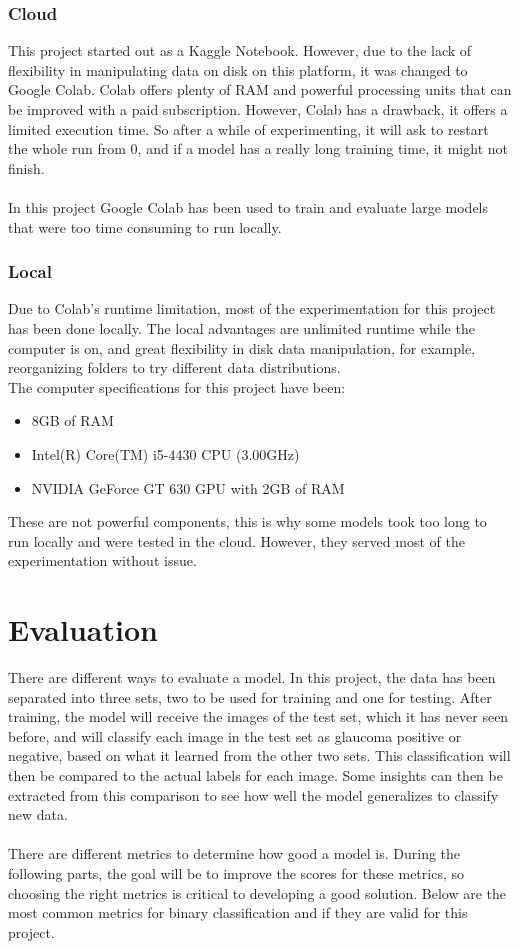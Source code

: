 \documentclass[11pt, a4paper]{article}
\begin{document}
\subsubsection{Cloud}
This project started out as a Kaggle Notebook. However, due to the lack of flexibility in manipulating data on disk on this platform, it was changed to Google Colab. Colab offers plenty of RAM and powerful processing units that can be improved with a paid subscription. However, Colab has a drawback, it offers a limited execution time. So after a while of experimenting, it will ask to restart the whole run from 0, and if a model has a really long training time, it might not finish.
\\
\\
In this project Google Colab has been used to train and evaluate large models that were too time consuming to run locally.
\subsubsection{Local} 
Due to Colab's runtime limitation, most of the experimentation for this project has been done locally. The local advantages are unlimited runtime while the computer is on, and great flexibility in disk data manipulation, for example, reorganizing folders to try different data distributions.
\\
The computer specifications for this project have been:
\begin{itemize}
    \item 8GB of RAM
    \item Intel(R) Core(TM) i5-4430 CPU (3.00GHz)
    \item NVIDIA GeForce GT 630 GPU with 2GB of RAM
\end{itemize}
These are not powerful components, this is why some models took too long to run locally and were tested in the cloud. However, they served most of the experimentation without issue.

\section{Evaluation}
There are different ways to evaluate a model. In this project, the data has been separated into three sets, two to be used for training and one for testing. After training, the model will receive the images of the test set, which it has never seen before, and will classify each image in the test set as glaucoma positive or negative, based on what it learned from the other two sets. This classification will then be compared to the actual labels for each image. Some insights can then be extracted from this comparison to see how well the model generalizes to classify new data.
\\
\\
There are different metrics to determine how good a model is. During the following parts, the goal will be to improve the scores for these metrics, so choosing the right metrics is critical to developing a good solution.
Below are the most common metrics for binary classification and if they are valid for this project.
\end{document}
